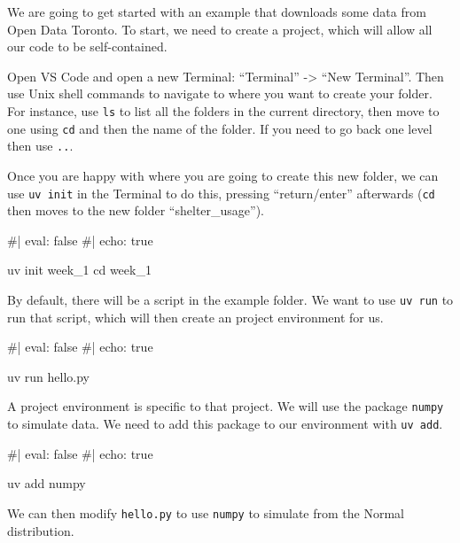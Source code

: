 \documentclass[
  letterpaper,
  DIV=11,
  numbers=noendperiod]{scrartcl}
\newenvironment{Shaded}{\begin{snugshade}}{\end{snugshade}}
\newcommand{\NormalTok}[1]{\textcolor[rgb]{0.00,0.23,0.31}{#1}}
\begin{document}
We are going to get started with an example that downloads some data
from Open Data Toronto. To start, we need to create a project, which
will allow all our code to be self-contained.

Open VS Code and open a new Terminal: ``Terminal'' -\textgreater{} ``New
Terminal''. Then use Unix shell commands to navigate to where you want
to create your folder. For instance, use \texttt{ls} to list all the
folders in the current directory, then move to one using \texttt{cd} and
then the name of the folder. If you need to go back one level then use
\texttt{..}.

Once you are happy with where you are going to create this new folder,
we can use \texttt{uv\ init} in the Terminal to do this, pressing
``return/enter'' afterwards (\texttt{cd} then moves to the new folder
``shelter\_usage'').

\begin{Shaded}
\begin{Highlighting}[]
\NormalTok{\#| eval: false}
\NormalTok{\#| echo: true}

\NormalTok{uv init week\_1}
\NormalTok{cd week\_1}
\end{Highlighting}
\end{Shaded}

By default, there will be a script in the example folder. We want to use
\texttt{uv\ run} to run that script, which will then create an project
environment for us.

\begin{Shaded}
\begin{Highlighting}[]
\NormalTok{\#| eval: false}
\NormalTok{\#| echo: true}

\NormalTok{uv run hello.py}
\end{Highlighting}
\end{Shaded}

A project environment is specific to that project. We will use the
package \texttt{numpy} to simulate data. We need to add this package to
our environment with \texttt{uv\ add}.

\begin{Shaded}
\begin{Highlighting}[]
\NormalTok{\#| eval: false}
\NormalTok{\#| echo: true}

\NormalTok{uv add numpy}
\end{Highlighting}
\end{Shaded}

We can then modify \texttt{hello.py} to use \texttt{numpy} to simulate
from the Normal distribution.
\end{document}
